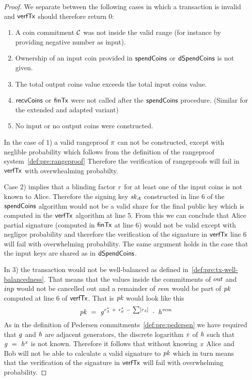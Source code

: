\begin{proof}
    We separate between the following cases in which a transaction is invalid and $\mathsf{verfTx}$ should therefore return 0:
    \begin{enumerate}
        \item A coin commitment $\mathcal{C}$ was not inside the valid range (for instance by providing negative number as input).
        \item Ownership of an input coin provided in $\mathsf{spendCoins}$ or $\mathsf{dSpendCoins}$ is not given.
        \item The total output coins value exceeds the total input coins value.
        \item $\mathsf{recvCoins}$ or $\mathsf{finTx}$ were not called after the $\mathsf{spendCoins}$ procedure. (Similar for the extended and adapted variant)
        \item No input or no output coins were constructed.
    \end{enumerate}

    In the case of 1) a valid rangeproof $\pi$ can not be constructed, except with neglible probability which follows from the definition of the rangeproof system~\ref{def:pre:rangeproof}
    Therefore the verification of rangeproofs will fail in $\mathsf{verfTx}$ with overwhealming probabilty.

    Case 2) implies that a blinding factor $\mathit{r}$ for at least one of the input coins is not known to Alice.
    Therefore the signing key $\mathit{sk}_{\mathit{A}}$ constructed in line 6 of the $\mathsf{spendCoins}$ algorithm would not be a valid share for the final public key which is computed in the $\mathsf{verfTx}$ algorithm at line 5.
    From this we can conclude that Alice partial signature (computed in $\mathsf{finTx}$ at line 6) would not be valid except with negligee probability and therefore the verification of the signature in $\mathsf{verfTx}$ line 6 will fail with overwhelming probability.
    The same argument holds in the case that the input keys are shared as in $\mathsf{dSpendCoins}$.

    In 3) the transaction would not be well-balanced as defined in~\ref{def:pre:tx-well-balancedness}.
    That means that the values inside the commitments of $out$ and $inp$ would not be cancelled out and a remainder of $\mathit{rem}$ would be part of $\mathit{pk}$ computed at line 6 of $\mathsf{verfTx}$.
    That is $\mathit{pk}$ would look like this
    \[
        \mathit{pk} ~=~ \mathit{g}^{\mathit{r}_{\mathit{A}}^* ~+~ \mathit{r}_{\mathit{B}}^* ~-~ \sum[\mathit{r}_{\mathit{A}}]} ~\cdot~ \mathit{h}^{\mathit{rem}}
    \]
    As in the definition of Pedersen commitments~\ref{def:pre:pedersen} we have required that $\mathit{g}$ and $\mathit{h}$ are adjacent generators, the discrete logarithm $\mathit{x}$ of $\mathit{h}$ such that $\mathit{g} ~=~ \mathit{h}^{\mathit{x}}$ is not known.
    Therefore it follows that without knowing $\mathit{x}$ Alice and Bob will not be able to calculate a valid signature to $\mathit{pk}$ which in turn means that the verification of the signature in $\mathsf{verfTx}$ will fail with overwhelming probability.


\end{proof}
